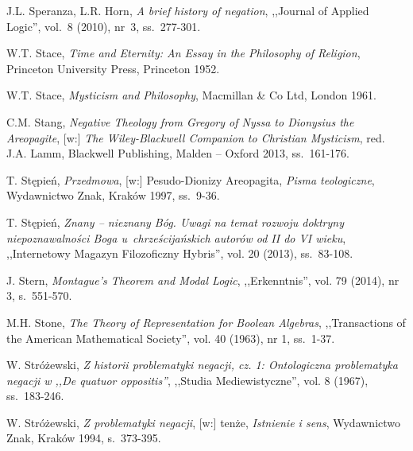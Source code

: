 \begin{thebibliography}{100}
J.L. Speranza, L.R. Horn, \textit{A brief history of negation}, ,,Journal of Applied Logic'', vol.~8 (2010), nr~3, ss.~277-301.


W.T. Stace, \textit{Time and Eternity: An Essay in the Philosophy of Religion}, Princeton University Press, Princeton 1952.

W.T. Stace, \textit{Mysticism and Philosophy}, Macmillan \& Co Ltd, London 1961.

C.M. Stang, \textit{Negative Theology from Gregory of Nyssa to Dionysius the Areopagite}, [w:] \textit{The Wiley-Blackwell Companion to Christian Mysticism},
red. J.A. Lamm, Blackwell Publishing, Malden -- Oxford 2013, ss.~161-176.



T. Stępień, \textit{Przedmowa}, [w:] Pesudo-Dionizy Areopagita, \textit{Pisma teologiczne}, Wydawnictwo Znak, Kraków 1997,  ss.~9-36.

T. Stępień, \textit{Znany -- nieznany Bóg. Uwagi na temat rozwoju doktryny niepoznawalności Boga u~chrześcijańskich autorów od II do VI wieku}, ,,Internetowy Magazyn Filozoficzny Hybris'', vol. 20 (2013), ss.~83-108.

J. Stern, \textit{Montague's Theorem and Modal Logic}, ,,Erkenntnis'', vol. 79 (2014), nr 3, s.~551-570.

M.H. Stone, \textit{The Theory of Representation for Boolean Algebras}, ,,Transactions of the American Mathematical Society'', vol. 40 (1963), nr 1, ss.~1-37.

W. Stróżewski, \textit{Z historii problematyki negacji, cz. 1: Ontologiczna problematyka negacji w ,,De quatuor oppositis''}, ,,Studia Mediewistyczne'', vol. 8 (1967), ss.~183-246.

W. Stróżewski, \textit{Z problematyki negacji}, [w:] tenże, \textit{Istnienie i sens}, Wydawnictwo Znak, Kraków 1994, s.~373-395.


\end{thebibliography}
